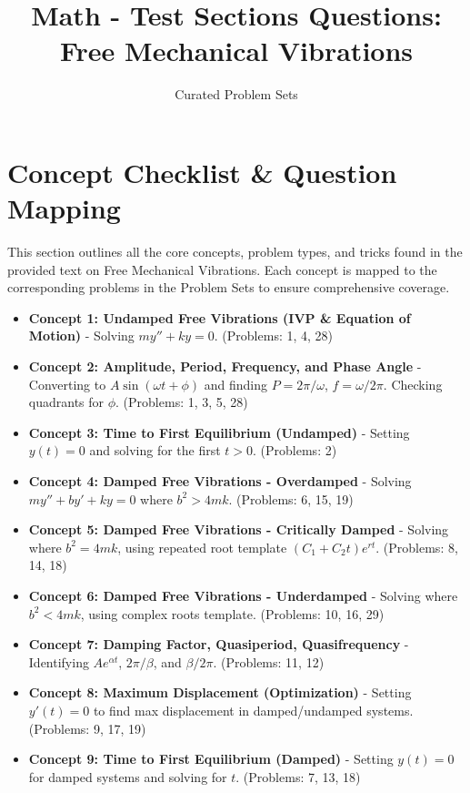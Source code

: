 \documentclass[11pt]{article}
\title{Math - Test Sections Questions: Free Mechanical Vibrations}
\author{Curated Problem Sets}
\date{}
\begin{document}
\maketitle
\tableofcontents
\newpage

\section{Concept Checklist \& Question Mapping}
This section outlines all the core concepts, problem types, and tricks found in the provided text on Free Mechanical Vibrations. Each concept is mapped to the corresponding problems in the Problem Sets to ensure comprehensive coverage.

\begin{itemize}
    \item \textbf{Concept 1: Undamped Free Vibrations (IVP \& Equation of Motion)} - Solving $my'' + ky = 0$. (Problems: 1, 4, 28)
    \item \textbf{Concept 2: Amplitude, Period, Frequency, and Phase Angle} - Converting to $A\sin(\omega t + \phi)$ and finding $P = 2\pi/\omega$, $f = \omega/2\pi$. Checking quadrants for $\phi$. (Problems: 1, 3, 5, 28)
    \item \textbf{Concept 3: Time to First Equilibrium (Undamped)} - Setting $y(t) = 0$ and solving for the first $t > 0$. (Problems: 2)
    \item \textbf{Concept 4: Damped Free Vibrations - Overdamped} - Solving $my'' + by' + ky = 0$ where $b^2 > 4mk$. (Problems: 6, 15, 19)
    \item \textbf{Concept 5: Damped Free Vibrations - Critically Damped} - Solving where $b^2 = 4mk$, using repeated root template $(C_1 + C_2t)e^{rt}$. (Problems: 8, 14, 18)
    \item \textbf{Concept 6: Damped Free Vibrations - Underdamped} - Solving where $b^2 < 4mk$, using complex roots template. (Problems: 10, 16, 29)
    \item \textbf{Concept 7: Damping Factor, Quasiperiod, Quasifrequency} - Identifying $Ae^{\alpha t}$, $2\pi/\beta$, and $\beta/2\pi$. (Problems: 11, 12)
    \item \textbf{Concept 8: Maximum Displacement (Optimization)} - Setting $y'(t) = 0$ to find max displacement in damped/undamped systems. (Problems: 9, 17, 19)
    \item \textbf{Concept 9: Time to First Equilibrium (Damped)} - Setting $y(t) = 0$ for damped systems and solving for $t$. (Problems: 7, 13, 18)

\end{itemize}
\end{document}
